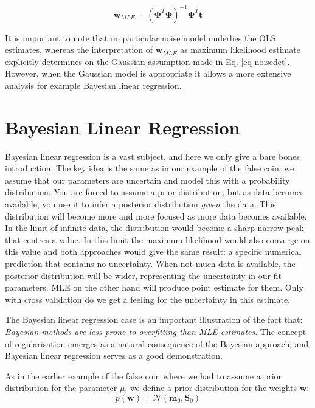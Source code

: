   \begin{equation}
    \boldsymbol{w}_{MLE} = (\boldsymbol{\Phi}^T\boldsymbol{\Phi})^{-1} \boldsymbol{\Phi}^T\boldsymbol{t}
      \label{eq-moorepenrose2}
  \end{equation}
    
  It is important to note that no particular noise model underlies the OLS estimates,
  whereas the interpretation of $\boldsymbol{w}_{MLE}$ as maximum likelihood estimate
  explicitly determines on the Gaussian assumption made in Eq. \ref{eq-noisedet}.
  However, when the Gaussian model is appropriate it allows a more extensive analysis
  for example Bayesian linear regression.




  
  \section{Bayesian Linear Regression}
  Bayesian linear regression is a vast subject, and here we only give a bare bones introduction. The key idea is the same as in our example
  of the false coin: we assume that our parameters are uncertain and model this with a probability distribution. You are forced to assume
  a prior distribution, but as data becomes available, you use it to infer a posterior distribution \emph{given} the data. This distribution
  will become more and more focused as more data becomes available. In the limit of infinite data, the distribution would become a sharp
  narrow peak that centres a value. In this limit the maximum likelihood would also converge on this value and both approaches would give
  the same result: a specific numerical prediction that contains no uncertainty. When not much data is available, the posterior distribution
  will be wider, representing the uncertainty in our fit parameters. MLE on the other hand will produce point estimate for them. Only with cross
  validation do we get a feeling for the uncertainty in this estimate.

  The Bayesian linear regression case is  an important illustration of the fact that:
  \emph{Bayesian  methods are less prone to overfitting than MLE estimates}. The concept of regularisation emerges as a natural consequence
  of the Bayesian approach, and Bayesian linear regression serves as a good demonstration.


    As in the earlier example of the false coin where we had to assume a prior distribution for the parameter $\mu$, we define a prior distribution
  for the weights $\boldsymbol{w}$:
  \begin{equation}
    p(\boldsymbol{w}) = \mathcal{N}( \boldsymbol{m}_0, \boldsymbol{S}_0 )
  \end{equation}

